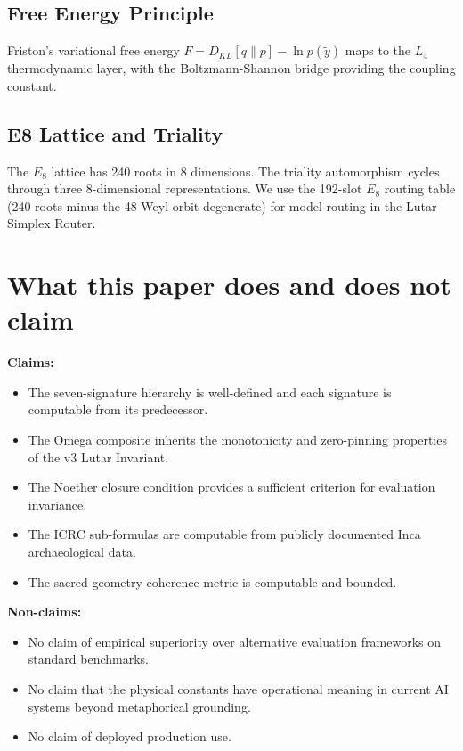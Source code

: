 \documentclass[11pt]{article}
\theoremstyle{plain}
\begin{document}
\subsection{Free Energy Principle}

Friston's variational free energy \( F = D_{KL}[q \| p] - \ln p(\tilde{y}) \) maps to the \( L_4 \) thermodynamic layer, with the Boltzmann-Shannon bridge providing the coupling constant.

\subsection{E8 Lattice and Triality}

The \( E_8 \) lattice has 240 roots in 8 dimensions. The triality automorphism cycles through three 8-dimensional representations. We use the 192-slot \( E_8 \) routing table (240 roots minus the 48 Weyl-orbit degenerate) for model routing in the Lutar Simplex Router.


\section{What this paper does and does not claim}

\textbf{Claims:}
\begin{itemize}
  \item The seven-signature hierarchy is well-defined and each signature is computable from its predecessor.
  \item The Omega composite inherits the monotonicity and zero-pinning properties of the v3 Lutar Invariant.
  \item The Noether closure condition provides a sufficient criterion for evaluation invariance.
  \item The ICRC sub-formulas are computable from publicly documented Inca archaeological data.
  \item The sacred geometry coherence metric is computable and bounded.
\end{itemize}

\textbf{Non-claims:}
\begin{itemize}
  \item No claim of empirical superiority over alternative evaluation frameworks on standard benchmarks.
  \item No claim that the physical constants have operational meaning in current AI systems beyond metaphorical grounding.
  \item No claim of deployed production use.
\end{itemize}
\end{document}
